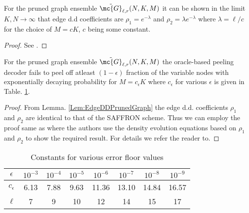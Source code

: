 \documentclass[conference,twocolumn]{IEEEtran}
\def\ceps{c_{\epsilon}}
\def\proofgap{-3ex}
\begin{document}
\begin{lemma}
\label{Lem:EdgeDDPrunedGraph}
For the pruned graph ensemble $\tilde{\mc{G}}_{\ell,r}(N,K,M)$ it can be shown in the limit $K,N\rightarrow\infty$ that edge d.d coefficients are $\rho_{1}=e^{-\lambda}$ and $\rho_{2}=\lambda e^{-\lambda}$ where $\lambda=\ell/c$ for the choice of $M=cK$, $c$ being some constant.
\end{lemma}
\vspace{\proofgap}
\begin{proof}
See .
\end{proof}

\begin{lemma}
For the pruned graph ensemble $\tilde{\mc{G}}_{\ell,r}(N, K,M)$ the oracle-based peeling decoder fails to peel off atleast $(1-\epsilon)$ fraction of the variable nodes with exponentially decaying probability for $M=\ceps K$ where $\ceps$ for various $\epsilon$ is given in Table. \ref{Table:constantsDE}.
\label{Lem:PeelingRegularAnalysis}
\vspace{\proofgap}
\end{lemma}
\begin{proof}
From Lemma. \ref{Lem:EdgeDDPrunedGraph} the edge d.d. coefficients $\rho_1$ and $\rho_2$ are identical to that of the SAFFRON scheme. Thus we can employ the proof same as \cite[Thm.~4.1]{lee2015saffron} where the authors use the density evolution equations based on $\rho_1$ and $\rho_2$ to show the required result. For details we refer the reader to.
\end{proof}

\begin{table}[h!]
\centering
\begin{tabular}{| c | c | c | c | c | c | c | c | }
\hline
$\epsilon$ & $10^{-3}$ & $10^{-4}$ & $10^{-5}$ & $10^{-6}$ &$ 10^{-7}$ & $10^{-8}$ & $10^{-9}$ \\ \hline
$\ceps$ & 6.13 & 7.88 & 9.63 & 11.36 & 13.10 & 14.84 & 16.57 \\ \hline
 $\ell$ & 7 & 9 & 10 & 12 & 14 & 15 & 17 \\ \hline
\end{tabular}
\vspace{1ex}
\caption{Constants for various error floor values}
\label{Table:constantsDE}
\end{table}
\end{document}
